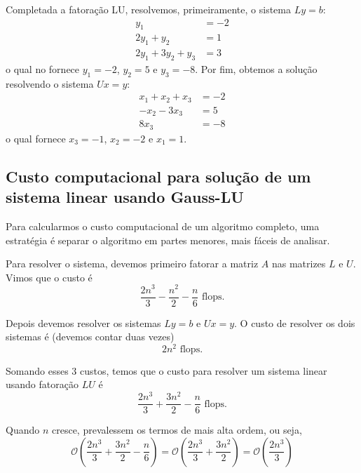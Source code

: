 \documentclass[
	12pt,				%
	oneside,			%
	a4paper,			%
	english,			%
	french,				%
	spanish,			%
	brazil				%
	]{abntex2}
\begin{document}
\begin{sol}
Completada a fatoração LU, resolvemos, primeiramente, o sistema $Ly = b$:
\begin{equation}
  \begin{split}
    y_1 &= -2\\
    2y_1 + y_2 &= 1\\
    2y_1 + 3y_2 + y_3 &= 3
  \end{split}
\end{equation}
o qual no fornece $y_1 = -2$, $y_2 = 5$ e $y_3 = -8$. Por fim, obtemos a solução resolvendo o sistema $Ux = y$:
\begin{equation}
  \begin{split}
  x_1 + x_2 + x_3 &= -2\\
  -x_2 - 3x_3 &= 5\\
  8x_3 &= -8
  \end{split}
\end{equation}
o qual fornece $x_3 = -1$, $x_2 = -2$ e $x_1 = 1$.
\end{sol}

\subsection{Custo computacional para solução de um sistema linear usando Gauss-LU}
Para calcularmos o custo computacional de um algoritmo completo, uma estratégia é separar o algoritmo em partes menores, mais fáceis de analisar.

Para resolver o sistema, devemos primeiro fatorar a matriz $A$ nas matrizes $L$ e $U$. Vimos que o custo é
\begin{equation} \dfrac{2n^3}{3}-\dfrac{n^2}{2}-\dfrac{n}{6} \text{~flops}. \end{equation}

Depois devemos resolver os sistemas $Ly=b$ e $Ux=y$. O custo de resolver os dois sistemas é (devemos contar duas vezes)
\begin{equation}  2 n^2\text{~flops}. \end{equation}

Somando esses $3$ custos, temos que o custo para resolver um sistema linear usando fatoração $LU$ é
\begin{equation} \dfrac{2n^3}{3}+\dfrac{3n^2}{2}-\dfrac{n}{6} \text{~flops}. \end{equation}

Quando $n$ cresce, prevalessem os termos de mais alta ordem, ou seja,
\begin{equation} \mathcal{O}(\dfrac{2n^3}{3}+\dfrac{3n^2}{2}-\dfrac{n}{6}) = \mathcal{O}(\dfrac{2n^3}{3}+\dfrac{3n^2}{2})=\mathcal{O}(\dfrac{2n^3}{3}) \end{equation}
\end{document}

